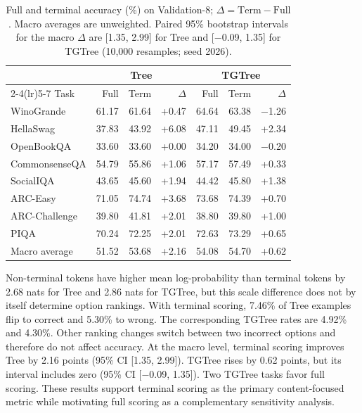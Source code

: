 \documentclass[11pt]{article}
\begin{document}
\begin{table}[htbp]
  \centering
  \small
  \setlength{\tabcolsep}{5pt}
  \begin{tabular}{lrrr@{\hspace{12pt}}rrr}
    \toprule
    & \multicolumn{3}{c}{Tree} & \multicolumn{3}{c}{TGTree} \\
    \cmidrule(lr){2-4}\cmidrule(lr){5-7}
    Task & Full & Term & $\Delta$ & Full & Term & $\Delta$ \\
    \midrule
    WinoGrande & 61.17 & 61.64 & +0.47 & 64.64 & 63.38 & $-$1.26 \\
    HellaSwag & 37.83 & 43.92 & +6.08 & 47.11 & 49.45 & +2.34 \\
    OpenBookQA & 33.60 & 33.60 & +0.00 & 34.20 & 34.00 & $-$0.20 \\
    CommonsenseQA & 54.79 & 55.86 & +1.06 & 57.17 & 57.49 & +0.33 \\
    SocialIQA & 43.65 & 45.60 & +1.94 & 44.42 & 45.80 & +1.38 \\
    ARC-Easy & 71.05 & 74.74 & +3.68 & 73.68 & 74.39 & +0.70 \\
    ARC-Challenge & 39.80 & 41.81 & +2.01 & 38.80 & 39.80 & +1.00 \\
    PIQA & 70.24 & 72.25 & +2.01 & 72.63 & 73.29 & +0.65 \\
    \midrule
    Macro average & 51.52 & 53.68 & +2.16 & 54.08 & 54.70 & +0.62 \\
    \bottomrule
  \end{tabular}
  \caption{Full and terminal accuracy (\%) on Validation-8; $\Delta=\mathrm{Term}-\mathrm{Full}$. Macro averages are unweighted. Paired 95\% bootstrap intervals for the macro $\Delta$ are [1.35, 2.99] for Tree and [$-$0.09, 1.35] for TGTree (10,000 resamples; seed 2026).}
  \label{tab:decom}
\end{table}

Non-terminal tokens have higher mean log-probability than terminal tokens by 2.68 nats for Tree and 2.86 nats for TGTree, but this scale difference does not by itself determine option rankings. With terminal scoring, 7.46\% of Tree examples flip to correct and 5.30\% to wrong. The corresponding TGTree rates are 4.92\% and 4.30\%. Other ranking changes switch between two incorrect options and therefore do not affect accuracy. At the macro level, terminal scoring improves Tree by 2.16 points (95\% CI [1.35, 2.99]). TGTree rises by 0.62 points, but its interval includes zero (95\% CI [$-$0.09, 1.35]). Two TGTree tasks favor full scoring. These results support terminal scoring as the primary content-focused metric while motivating full scoring as a complementary sensitivity analysis.
\end{document}
